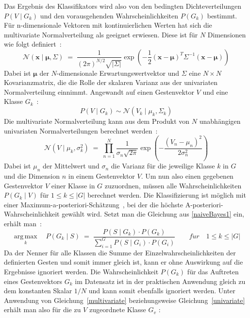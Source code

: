 Das Ergebnis des Klassifikators wird also von den bedingten Dichteverteilungen $P(V\mid G_k)$ und den vorausgehenden Wahrscheinlichkeiten $P(G_k)$ bestimmt. Für n-dimensionale Vektoren mit kontinuierlichen Werten hat sich die multivariate Normalverteilung als geeignet erwiesen. Diese ist für $N$ Dimensionen wie folgt definiert~\cite{flexibleSystem}:
\begin{equation}
    {\mathcal {N}}(\mathbf{x} \mid \mathbf{\mu}, \Sigma) \; = \; \frac{1}{(2\pi)^{N/2} \sqrt{\lvert\Sigma\rvert}} \exp{ \left( -\frac{1}{2}(\mathbf{x} - \mathbf{\mu})^T \Sigma^{-1} (\mathbf{x} - \mathbf{\mu}) \right)}
\end{equation}
Dabei ist $\mathbf{\mu}$ der $N$-dimensionale Erwartungswertvektor und $\Sigma$ eine $N\times N$ Kovarianzmatrix, die die Rolle der skalaren Varianz aus der univariaten Normalverteilung einnimmt. Angewandt auf einen Gestenvektor $V$ und eine Klasse $G_k$~\cite{gillianANBC}:
\begin{equation} \label{multivariate} 
    {P(V\mid G_k)} \sim {\mathcal {N}}({V_k \mid \mu_k, \Sigma_k} )
\end{equation}
Die multivariate Normalverteilung kann aus dem Produkt von $N$ unabhängigen univariaten Normalverteilungen berechnet werden~\cite{gillianANBC}:
\begin{equation} \label{univariate}
    \mathcal {N}(V\mid \mu_k ,\sigma^{2}_k) \; = \; \prod_{n=1}^N {\frac {1}{\sigma_{n} \sqrt {2\pi}}}\operatorname {exp} \left(-{\frac {(V_n-\mu_{n} )^{2}}{2\sigma^{2}_{n}}}\right)
\end{equation}
Dabei ist $\mu_{n}$ der Mittelwert und $\sigma_{n}$ die Varianz für die jeweilige Klasse $k$ in $G$ und die Dimension $n$ in einem Gestenvektor $V$. Um nun also einen gegebenen Gestenvektor $V$ einer Klasse in $G$ zuzuordnen, müssen alle Wahrscheinlichkeiten $P(G_k\mid V)$ für $1\leq k\leq |G|$ berechnet werden. Die Klassifizierung ist möglich mit einer Maximum-a-posteriori-Schätzung~\cite{gillianANBC}, bei der die höchste A-posteriori-Wahrscheinlichkeit gewählt wird. Setzt man die Gleichung aus \eqref{naiveBayes1} ein, erhält man~\cite{gillianANBC}: 
\begin{equation}
    {\underset {k}{\operatorname {arg\,max} }\quad
        P(G_k\mid S) \; = \; \frac{P(S\mid G_k)\cdot P(G_k)}{\sum_{i=1} ^{G} P(S\mid G_i) \cdot P(G_i)}}\qquad
    f\ddot{u}r\quad 1\leq k\leq |G|
\end{equation}
Da der Nenner für alle Klassen die Summe der Einzelwahrscheinlichkeiten der definierten Gesten und somit immer gleich ist, kann er ohne Auswirkung auf die Ergebnisse ignoriert werden. Die Wahrscheinlichkeit $P(G_k)$ für das Auftreten eines Gestenvektors $G_k$ im Datensatz ist in der praktischen Anwendung gleich zu dem konstanten Skalar $1/N$ und kann somit ebenfalls ignoriert werden. Unter Anwendung von Gleichung~\eqref{multivariate} beziehungsweise Gleichung~\eqref{univariate} erhält man also für die zu $V$ zugeordnete Klasse $G_v$ \cite{gillianANBC}:
